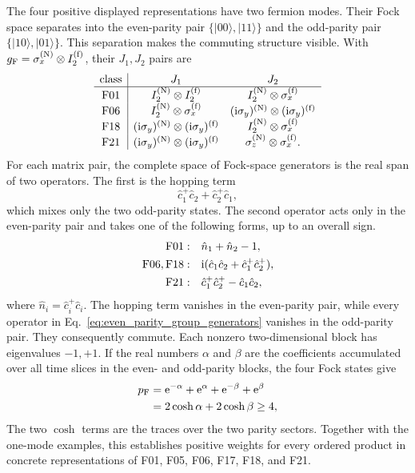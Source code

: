 \documentclass[onecolumn,aps,prb,amsmath,amssymb,superscriptaddress,longbibliography,floatfix]{revtex4-2}
\newcommand{\ee}{\mathrm{e}}
\newcommand{\ii}{\mathrm{i}}
\begin{document}
The four positive displayed representations have two fermion modes.  Their
Fock space separates into the even-parity pair
\(\{\lvert00\rangle,\lvert11\rangle\}\) and the odd-parity pair
\(\{\lvert10\rangle,\lvert01\rangle\}\).  This separation makes the
commuting structure visible.  With
\(g_{\rm F}=\sigma_x^{({\rm N})}\otimes I_2^{({\rm f})}\), their
\(J_1,J_2\) pairs are
\begin{equation}
\begin{array}{c|cc}
\text{class}&J_1&J_2\\ \hline
\mathrm{F01}&I_2^{({\rm N})}\otimes I_2^{({\rm f})}
&I_2^{({\rm N})}\otimes\sigma_x^{({\rm f})}\\
\mathrm{F06}&I_2^{({\rm N})}\otimes\sigma_x^{({\rm f})}
&(\ii\sigma_y)^{({\rm N})}\otimes(\ii\sigma_y)^{({\rm f})}\\
\mathrm{F18}&(\ii\sigma_y)^{({\rm N})}\otimes(\ii\sigma_y)^{({\rm f})}
&I_2^{({\rm N})}\otimes\sigma_x^{({\rm f})}\\
\mathrm{F21}&(\ii\sigma_y)^{({\rm N})}\otimes(\ii\sigma_y)^{({\rm f})}
&\sigma_z^{({\rm N})}\otimes\sigma_x^{({\rm f})}.
\end{array}
    \label{eq:two_mode_commuting_representations}
\end{equation}
For each matrix pair, the complete space of Fock-space generators is the real
span of two operators.  The first is the hopping term
\begin{equation}
    \hat c_1^+\hat c_2+\hat c_2^+\hat c_1,
    \label{eq:odd_parity_group_generator}
\end{equation}
which mixes only the two odd-parity states.  The second operator acts
only in the even-parity pair and takes one of the following forms, up to an
overall sign.
\begin{align}
\mathrm{F01}:\quad
    &\hat n_1+\hat n_2-1,\notag\\
\mathrm{F06},\mathrm{F18}:\quad
    &\ii(\hat c_1\hat c_2+
        \hat c_1^+\hat c_2^+),\notag\\
\mathrm{F21}:\quad
    &\hat c_1^+\hat c_2^+-\hat c_1\hat c_2,
    \label{eq:even_parity_group_generators}
\end{align}
where \(\hat n_i=\hat c_i^+\hat c_i\).  The hopping term vanishes in the
even-parity pair, while every operator in
Eq.~\eqref{eq:even_parity_group_generators} vanishes in the odd-parity pair.
They consequently commute.  Each nonzero two-dimensional block has
eigenvalues \(-1,+1\).  If the real numbers \(\alpha\) and \(\beta\) are the
coefficients accumulated over all time slices in the even- and odd-parity
blocks, the four Fock states give
\begin{equation}
\begin{aligned}
    p_{\rm F}
    &=\ee^{-\alpha}+\ee^\alpha+\ee^{-\beta}+\ee^\beta\\
    &=2\cosh\alpha+2\cosh\beta\geq4,
\end{aligned}
    \label{eq:two_mode_commuting_weight}
\end{equation}
The two \(\cosh\) terms are the traces over the two parity sectors.  Together
with the one-mode examples, this establishes positive weights for every
ordered product in concrete representations of F01, F05, F06, F17, F18, and
F21.
\end{document}
